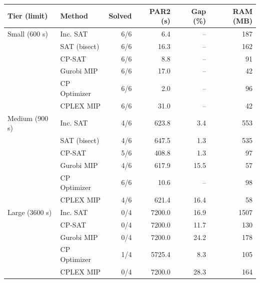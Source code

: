 \begin{tabular}{llrrrr}
\toprule
Tier (limit) & Method & Solved & PAR2 (s) & Gap (\%) & RAM (MB) \\
\midrule
Small (600 s) & Inc. SAT & 6/6 & 6.4 & -- & 187 \\
 & SAT (bisect) & 6/6 & 16.3 & -- & 162 \\
 & CP-SAT & 6/6 & 8.8 & -- & 91 \\
 & Gurobi MIP & 6/6 & 17.0 & -- & 42 \\
 & CP Optimizer & 6/6 & 2.0 & -- & 96 \\
 & CPLEX MIP & 6/6 & 31.0 & -- & 42 \\
\midrule
Medium (900 s) & Inc. SAT & 4/6 & 623.8 & 3.4 & 553 \\
 & SAT (bisect) & 4/6 & 647.5 & 1.3 & 535 \\
 & CP-SAT & 5/6 & 408.8 & 1.3 & 97 \\
 & Gurobi MIP & 4/6 & 617.9 & 15.5 & 57 \\
 & CP Optimizer & 6/6 & 10.6 & -- & 98 \\
 & CPLEX MIP & 4/6 & 621.4 & 16.4 & 58 \\
\midrule
Large (3600 s) & Inc. SAT & 0/4 & 7200.0 & 16.9 & 1507 \\
 & CP-SAT & 0/4 & 7200.0 & 11.7 & 130 \\
 & Gurobi MIP & 0/4 & 7200.0 & 24.2 & 178 \\
 & CP Optimizer & 1/4 & 5725.4 & 8.3 & 105 \\
 & CPLEX MIP & 0/4 & 7200.0 & 28.3 & 164 \\
\bottomrule
\end{tabular}
